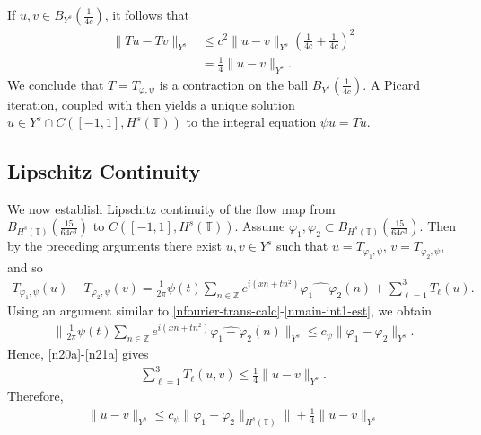 \documentclass[12pt,reqno]{amsart}
\numberwithin{equation}{section}  %
\newcommand{\zz}{\mathbb{Z}}
\newcommand{\ci}{\mathbb{T}}
\newcommand{\wh}{\widehat}
\newcommand{\vp}{\varphi}
\renewcommand{\cref}{\Cref}
\begin{document}
%
If $u, v \in B_{Y^{s}}(\frac{1}{4c})$, it follows that
%
\begin{equation}
	\label{n21a}
	\begin{split}
		\|Tu - Tv \|_{Y^s}
		& \le c^2 \|u -v \|_{Y^s} \left( \frac{1}{4c} + 
		\frac{1}{4c} \right)^2
		\\
		& = \frac{1}{4} \|u -v \|_{Y^s}. 
	\end{split}
\end{equation}
%
We conclude that $T = T_{\vp, \psi}$ is a contraction on the ball
$B_{Y^{s}}(\frac{1}{4c})$. A Picard iteration, coupled with
\cref{nlem:cutoff-loc-soln} then yields a unique solution $u \in Y^{s} \cap
C(\left[ -1, 1 \right], H^{s}(\ci))$ to the integral equation $\psi u = Tu$.
%
%
%
\subsection{Lipschitz Continuity} 
\label{ssec:lip-cont-flow-map}
We now establish Lipschitz continuity of the flow map from
\\ $B_{H^{s}(\ci)}(\frac{15}{64c^{3}})$ to $C(\left[ -1, 1 \right], H^{s}(\ci))$.
Assume $\vp_1, \vp_2
\subset B_{H^s(\ci)}(\frac{15}{64c^{3}})$.
Then by the preceding arguments there exist $u, v \in Y^s$ such that 
$u = T_{\vp_1, \psi}$, $v = T_{\vp_2, \psi}$, and so
%
%
\begin{equation*}
	\begin{split}
		T_{\vp_1, \psi}(u) -
    T_{\vp_2, \psi}(v) = \frac{1}{2\pi} \psi(t) \sum_{n \in
		\zz}e^{i\left( xn + tn^{2} \right)} \wh{\vp_1 - \vp_2}(n) + \sum_{\ell=1
    }^{3} T_{\ell}(u).
	\end{split}
\end{equation*}
%
%
Using an argument similar to \eqref{nfourier-trans-calc}-\eqref{nmain-int1-est},
we obtain
%
%
\begin{equation*}
	\begin{split}
		\| \frac{1}{2\pi} \psi(t) \sum_{n \in
		\zz}e^{i\left( xn + tn^{2} \right)} \wh{\vp_1 - \vp_2}(n)\|_{Y^s}
		\le c_{\psi} \|\vp_{1} - \vp_{2}\|_{Y^s}.
	\end{split}
\end{equation*}
%
%
Hence, \eqref{n20a}-\eqref{n21a} gives
%
%
\begin{equation*}
	\begin{split}
    \sum_{\ell=1}^{3} T_{\ell}(u,v) \le \frac{1}{4}\|u-v\|_{Y^s}.
	\end{split}
\end{equation*}
%
%
Therefore,
%
%
\begin{equation*}
	\begin{split}
    \|u - v \|_{Y^s} \le c_{\psi}
		\|\vp_{1} - \vp_{2} \|_{H^{s}\left( \ci \right)}\| +
		\frac{1}{4} \|u -v \|_{Y^s}
	\end{split}
\end{equation*}
\end{document}
